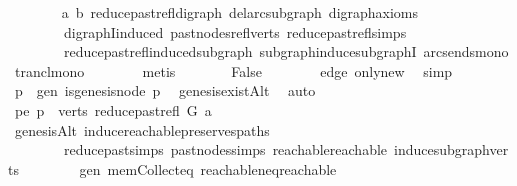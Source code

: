 \begin{isabellebody}
\ \ \ \ \ \ \isamarkupfalse%
\ a\ b\ reduce{\isacharunderscore}{\kern0pt}past{\isacharunderscore}{\kern0pt}refl{\isacharunderscore}{\kern0pt}digraph\ del{\isacharunderscore}{\kern0pt}arc{\isacharunderscore}{\kern0pt}subgraph\ digraph{\isacharunderscore}{\kern0pt}axioms\isanewline
\ \ \ \ \ \ \ \ digraphI{\isacharunderscore}{\kern0pt}induced\ past{\isacharunderscore}{\kern0pt}nodes{\isacharunderscore}{\kern0pt}refl{\isacharunderscore}{\kern0pt}verts\ reduce{\isacharunderscore}{\kern0pt}past{\isacharunderscore}{\kern0pt}refl{\isachardot}{\kern0pt}simps\isanewline
\ \ \ \ \ \ \ \ reduce{\isacharunderscore}{\kern0pt}past{\isacharunderscore}{\kern0pt}refl{\isacharunderscore}{\kern0pt}induced{\isacharunderscore}{\kern0pt}subgraph\ subgraph{\isacharunderscore}{\kern0pt}induce{\isacharunderscore}{\kern0pt}subgraphI\ arcs{\isacharunderscore}{\kern0pt}ends{\isacharunderscore}{\kern0pt}mono\ trancl{\isacharunderscore}{\kern0pt}mono\isanewline
\ \ \ \ \ \ \isamarkupfalse%
\ metis\isanewline
\ \ \ \ \isamarkupfalse%
\ \isamarkupfalse%
\ False\isanewline
\ \ \ \ \ \ \isamarkupfalse%
\ edge\ only{\isacharunderscore}{\kern0pt}new\ \isamarkupfalse%
\ simp\isanewline
\ \ \isamarkupfalse%
\isanewline
\ \ \ \ \isamarkupfalse%
\ p\ \ gen{\isacharcolon}{\kern0pt}\ {\isachardoublequoteopen}is{\isacharunderscore}{\kern0pt}genesis{\isacharunderscore}{\kern0pt}node\ p{\isachardoublequoteclose}\ \isamarkupfalse%
\ genesis{\isacharunderscore}{\kern0pt}existAlt\ \isamarkupfalse%
\ auto\isanewline
\ \ \ \ \isamarkupfalse%
\ pe{\isacharcolon}{\kern0pt}\ {\isachardoublequoteopen}p\ {\isasymin}\ verts\ {\isacharparenleft}{\kern0pt}reduce{\isacharunderscore}{\kern0pt}past{\isacharunderscore}{\kern0pt}refl\ G\ a{\isacharparenright}{\kern0pt}{\isachardoublequoteclose}\isanewline
\ \ \ \ \ \ \isamarkupfalse%
\ genesisAlt\ induce{\isacharunderscore}{\kern0pt}reachable{\isacharunderscore}{\kern0pt}preserves{\isacharunderscore}{\kern0pt}paths\isanewline
\ \ \ \ \ \ \ \ reduce{\isacharunderscore}{\kern0pt}past{\isachardot}{\kern0pt}simps\ past{\isacharunderscore}{\kern0pt}nodes{\isachardot}{\kern0pt}simps\ reachable{}{\isacharunderscore}{\kern0pt}reachable\ induce{\isacharunderscore}{\kern0pt}subgraph{\isacharunderscore}{\kern0pt}verts\isanewline
\ \ \ \ \ \ \ \ gen\ mem{\isacharunderscore}{\kern0pt}Collect{\isacharunderscore}{\kern0pt}eq\ reachable{\isacharunderscore}{\kern0pt}neq{\isacharunderscore}{\kern0pt}reachable{}\isanewline

\end{isabellebody}
